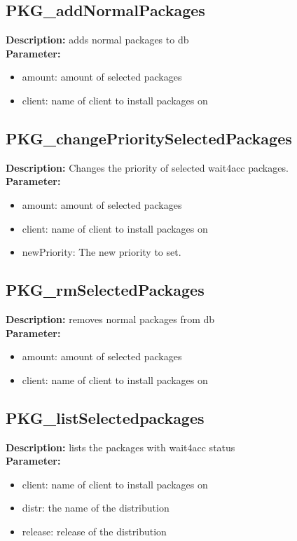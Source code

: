 \subsection{PKG\_addNormalPackages}
\textbf{Description:} adds normal packages to db\\
\textbf{Parameter:}
\begin{itemize}
\item amount: amount of selected packages
\item client: name of client to install packages on
\end{itemize}

\subsection{PKG\_changePrioritySelectedPackages}
\textbf{Description:} Changes the priority of selected wait4acc packages.\\
\textbf{Parameter:}
\begin{itemize}
\item amount: amount of selected packages
\item client: name of client to install packages on
\item newPriority: The new priority to set.
\end{itemize}

\subsection{PKG\_rmSelectedPackages}
\textbf{Description:} removes normal packages from db\\
\textbf{Parameter:}
\begin{itemize}
\item amount: amount of selected packages
\item client: name of client to install packages on
\end{itemize}

\subsection{PKG\_listSelectedpackages}
\textbf{Description:} lists the packages with wait4acc status\\
\textbf{Parameter:}
\begin{itemize}
\item client: name of client to install packages on
\item distr: the name of the distribution
\item release: release of the distribution
\end{itemize}

